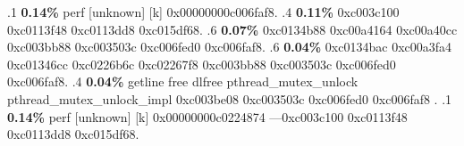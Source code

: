 \begin{profile}
{.1 \textbf{ 0.14\%} perf             [unknown]              [k] 0x00000000c006faf8. 
.4 \textbf{0.11\%} 0xc003c100\newline {} 0xc0113f48\newline {} 0xc0113dd8\newline {} 0xc015df68. 
.6 \textbf{0.07\%} 0xc0134b88\newline {} 0xc00a4164\newline {} 0xc00a40cc\newline {} 0xc003bb88\newline {} 0xc003503c\newline {} 0xc006fed0\newline {} 0xc006faf8. 
.6 \textbf{0.04\%} 0xc0134bac\newline {} 0xc00a3fa4\newline {} 0xc01346cc\newline {} 0xc0226b6c\newline {} 0xc02267f8\newline {} 0xc003bb88\newline {} 0xc003503c\newline {} 0xc006fed0\newline {} 0xc006faf8. 
.4 \textbf{0.04\%} getline\newline {} free\newline {} dlfree\newline {} pthread\_mutex\_unlock\newline {} pthread\_mutex\_unlock\_impl\newline {} 0xc003be08\newline {} 0xc003503c\newline {} 0xc006fed0\newline {} 0xc006faf8\newline {} . 
.1 \textbf{ 0.14\%} perf             [unknown]              [k] 0x00000000c0224874\newline {} ---0xc003c100\newline {} 0xc0113f48\newline {} 0xc0113dd8\newline {} 0xc015df68. 
}
\end{profile}

